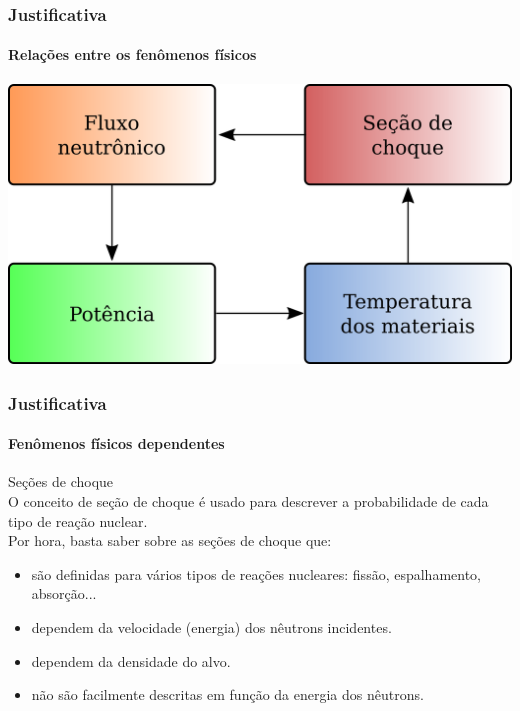 \documentclass[svgnames,smaller,table]{beamer}
\begin{document}
  \begin{frame}
    \frametitle{Justificativa}
    \framesubtitle{Relações entre os fenômenos físicos}
    \centering\includegraphics[scale=0.9]{../figuras/justificativa.png}
\end{frame}

\begin{frame}
  \frametitle{Justificativa}
  \framesubtitle{Fenômenos físicos dependentes}
  \centering
  \alert{Seções de choque}
  \\
  \vspace{0.5cm}
  O conceito de seção de choque é usado para descrever a probabilidade de cada
  tipo de reação nuclear.
  \\
  \vspace{0.5cm}
  Por hora, basta saber sobre as seções de choque que:
  \begin{itemize}
  \item são definidas para vários tipos de reações nucleares: fissão, espalhamento, absorção...
  \item dependem da velocidade (energia) dos nêutrons incidentes.
  \item dependem da densidade do alvo.
  \item \alert{não} são facilmente descritas em função da energia dos nêutrons.
  \end{itemize}
  
\end{frame}
\end{document}
